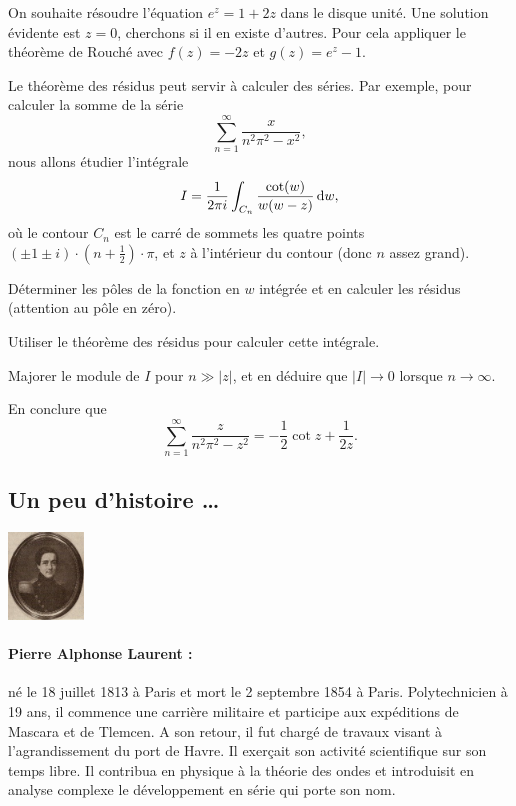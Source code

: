 \begin{exer} On souhaite résoudre l'équation $e^z=1+2 z$ dans le disque unité. Une solution évidente est $z=0$, cherchons si il en existe d'autres. Pour cela appliquer le théorème de Rouché avec $f(z)=-2 z$ et $g(z)=e^z-1$.
\end{exer}


\begin{exer}
Le théorème des résidus peut servir à calculer des séries. Par exemple, pour calculer la somme de la série
\[\sum_{n=1}^\infty \frac{x}{n^2 \pi^2-x^2},\]
nous allons étudier l'intégrale 
\[I=\frac{1}{2 \pi i}\int_{C_n} \frac{\cot(w)}{w(w - z)} \mathop{}\mathopen{}\mathrm{d} w,\]
où le contour $C_n$ est le carré de sommets les quatre points $(\pm 1 \pm i)\cdot(n+\frac{1}{2})\cdot\pi$, et $z$ à l'intérieur du contour (donc $n$ assez grand).
\begin{MYenumerate}
\item Déterminer les pôles de la fonction en $w$ intégrée et en calculer les résidus (attention au pôle en zéro).
\item Utiliser le théorème des résidus pour calculer cette intégrale.
\item Majorer le module de $I$ pour $n \gg \lvert z \rvert$, et en déduire que $\lvert I \rvert \to 0$ lorsque $n \to \infty$.
\item En conclure que
\[\sum_{n=1}^\infty \frac{z}{n^2 \pi^2-z^2} = -\frac{1}{2}\cot z + \frac{1}{2 z}.\]
\end{MYenumerate}
\end{exer}

\newpage 
\subsection*{Un peu d'histoire \dots}

\begin{minipage}{0.2\linewidth}
\begin{center}\includegraphics[width=2cm]{images/Laurent.jpg}\end{center}
\end{minipage}
\begin{minipage}{0.80 \linewidth}
\small{\paragraph*{Pierre Alphonse Laurent :} né le 18 juillet 1813 à Paris et mort le 2 septembre 1854 à Paris. Polytechnicien à 19 ans, il commence une carrière militaire et participe aux expéditions de Mascara et de Tlemcen. A son retour, il fut chargé de travaux visant à l'agrandissement du port de Havre. Il exerçait son activité scientifique sur son temps libre. Il contribua en physique à la théorie des ondes et introduisit en analyse complexe le développement en série qui porte son nom.}
\end{minipage}

